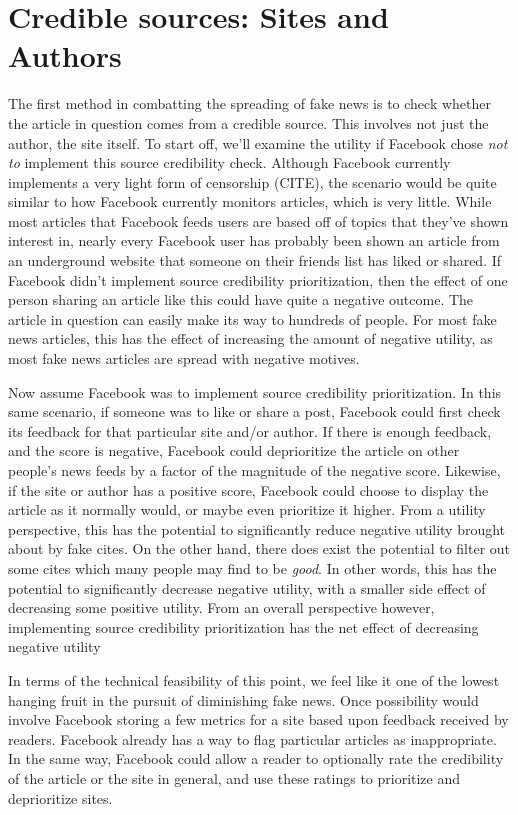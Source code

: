 \documentclass[12pt]{article}
\begin{document}
\section{Credible sources: Sites and Authors}
The first method in combatting the spreading of fake news is to check whether the article in question comes from a credible source. This involves not just the author, the site itself. To start off, we'll examine the utility if Facebook chose \textit{not to} implement this source credibility check. Although Facebook currently implements a very light form of censorship (CITE), the scenario would be quite similar to how Facebook currently monitors articles, which is very little. While most articles that Facebook feeds users are based off of topics that they've shown interest in, nearly every Facebook user has probably been shown an article from an underground website that someone on their friends list has liked or shared. If Facebook didn't implement source credibility prioritization, then the effect of one person sharing an article like this could have quite a negative outcome. The article in question can easily make its way to hundreds of people. For most fake news articles, this has the effect of increasing the amount of negative utility, as most fake news articles are spread with negative motives.

Now assume Facebook was to implement source credibility prioritization. In this same scenario, if someone was to like or share a post, Facebook could first check its feedback for that particular site and/or author. If there is enough feedback, and the score is negative, Facebook could deprioritize the article on other people's news feeds by a factor of the magnitude of the negative score. Likewise, if the site or author has a positive score, Facebook could choose to display the article as it normally would, or maybe even prioritize it higher. From a utility perspective, this has the potential to significantly reduce negative utility brought about by fake cites. On the other hand, there does exist the potential to filter out some cites which many people may find to be \textit{good}. In other words, this has the potential to significantly decrease negative utility, with a smaller side effect of decreasing some positive utility. From an overall perspective however, implementing source credibility prioritization has the net effect of decreasing negative utility

In terms of the technical feasibility of this point, we feel like it one of the lowest hanging fruit in the pursuit of diminishing fake news. Once possibility would involve Facebook storing a few metrics for a site based upon feedback received by readers. Facebook already has a way to flag particular articles as inappropriate. In the same way, Facebook could allow a reader to optionally rate the credibility of the article or the site in general, and use these ratings to prioritize and deprioritize sites.
\end{document}
